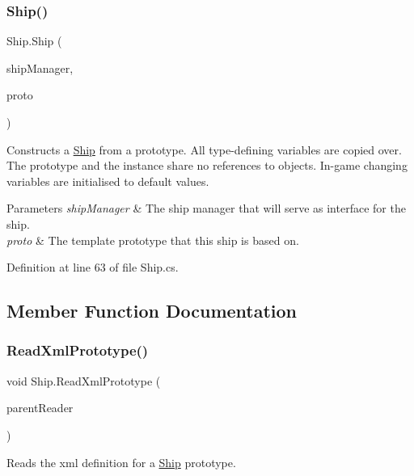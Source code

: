 \subsubsection{\texorpdfstring{Ship()}{Ship()}\hspace{0.1cm}{\footnotesize\ttfamily [2/2]}}
{\footnotesize\ttfamily Ship.\+Ship (\begin{DoxyParamCaption}\item[{\hyperlink{class_ship_manager}{Ship\+Manager}}]{ship\+Manager,  }\item[{\hyperlink{class_ship}{Ship}}]{proto }\end{DoxyParamCaption})}



Constructs a \hyperlink{class_ship}{Ship} from a prototype. All type-\/defining variables are copied over. The prototype and the instance share no references to objects. In-\/game changing variables are initialised to default values. 


\begin{DoxyParams}{Parameters}
{\em ship\+Manager} & The ship manager that will serve as interface for the ship.\\
\hline
{\em proto} & The template prototype that this ship is based on.\\
\hline
\end{DoxyParams}


Definition at line 63 of file Ship.\+cs.



\subsection{Member Function Documentation}
\mbox{\label{class_ship_aa81fd20c93280bc0325cf0da26f14ca5}} 
\subsubsection{\texorpdfstring{Read\+Xml\+Prototype()}{ReadXmlPrototype()}}
{\footnotesize\ttfamily void Ship.\+Read\+Xml\+Prototype (\begin{DoxyParamCaption}\item[{Xml\+Reader}]{parent\+Reader }\end{DoxyParamCaption})}



Reads the xml definition for a \hyperlink{class_ship}{Ship} prototype. 


